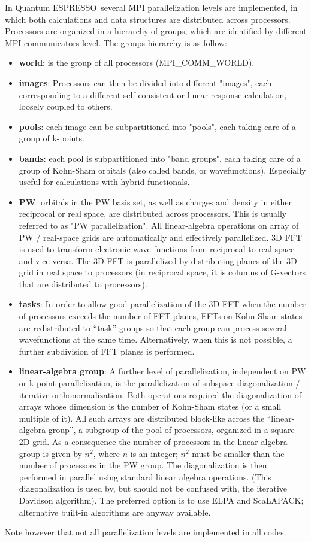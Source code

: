 \documentclass[12pt,a4paper]{article}
\def\qe{{\sc Quantum ESPRESSO}}
\begin{document}
In \qe\ several MPI parallelization levels are
implemented, in which both calculations
and data structures are distributed across processors.
Processors are organized in a hierarchy of groups,
which are identified by different MPI communicators level.
The groups hierarchy is as follow:
\begin{itemize}
\item {\bf world}: is the group of all processors (MPI\_COMM\_WORLD).
\item
{\bf images}: Processors can then be divided into different "images", each corresponding to a
different self-consistent or linear-response
calculation, loosely coupled to others.
\item
{\bf pools}: each image can be subpartitioned into
"pools", each taking care of a group of k-points.
\item
{\bf bands}: each pool is subpartitioned into
"band groups", each taking care of a group
of Kohn-Sham orbitals (also called bands, or
wavefunctions). Especially useful for calculations
with hybrid functionals.
\item
{\bf PW}: orbitals in the PW basis set,
as well as charges and density in either
reciprocal or real space, are distributed
across processors.
This is usually referred to as "PW parallelization".
All linear-algebra operations on array of  PW /
real-space grids are automatically and effectively parallelized.
3D FFT is used to transform electronic wave functions from
reciprocal to real space and vice versa. The 3D FFT is
parallelized by distributing planes of the 3D grid in real
space to processors (in reciprocal space, it is columns of
G-vectors that are distributed to processors).
\item
{\bf tasks}:
In order to allow good parallelization of the 3D FFT when
the number of processors exceeds the number of FFT planes,
FFTs on Kohn-Sham states are redistributed to
``task'' groups so that each group
can process several wavefunctions at the same time.
Alternatively, when this is not possible, a further
subdivision of FFT planes is performed.
\item
{\bf linear-algebra group}:
A further level of parallelization, independent on
PW or k-point parallelization, is the parallelization of
subspace diagonalization / iterative orthonormalization.
 Both operations required the diagonalization of
arrays whose dimension is the number of Kohn-Sham states
(or a small multiple of it). All such arrays are distributed block-like
across the ``linear-algebra group'', a subgroup of the pool of processors,
organized in a square 2D grid. As a consequence the number of processors
in the linear-algebra group is given by $n^2$, where $n$ is an integer;
$n^2$ must be smaller than the number of processors in the PW group.
The diagonalization is then performed
in parallel using standard linear algebra operations.
(This diagonalization is used by, but should not be confused with,
the iterative Davidson algorithm). The preferred option is to use
ELPA and ScaLAPACK; alternative built-in algorithms are anyway available.
\end{itemize}
Note however that not all parallelization levels
are implemented in all codes.
\end{document}
